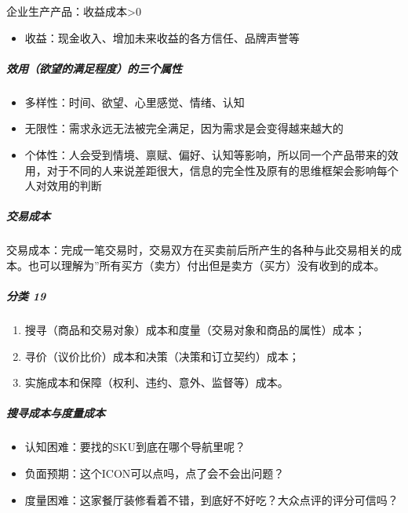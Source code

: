 \documentclass[letterpaper,10pt,english]{sphinxmanual}
\begin{document}
企业生产产品：收益\sphinxhyphen{}成本>0
\begin{itemize}
\item {} 
收益：现金收入、增加未来收益的各方信任、品牌声誉等

\end{itemize}


\subparagraph{效用（欲望的满足程度）的三个属性}
\label{\detokenize{chapter_idea/business:id18}}\begin{itemize}
\item {} 
多样性：时间、欲望、心里感觉、情绪、认知

\item {} 
无限性：需求永远无法被完全满足，因为需求是会变得越来越大的

\item {} 
个体性：人会受到情境、禀赋、偏好、认知等影响，所以同一个产品带来的效用，对于不同的人来说差距很大，信息的完全性及原有的思维框架会影响每个人对效用的判断

\end{itemize}


\subparagraph{交易成本}
\label{\detokenize{chapter_idea/business:id19}}
交易成本：完成一笔交易时，交易双方在买卖前后所产生的各种与此交易相关的成本。也可以理解为”所有买方（卖方）付出但是卖方（买方）没有收到的成本。


\subparagraph{分类 19\sphinxfootnotemark[412]}
\label{\detokenize{chapter_idea/business:id20}}%
\begin{footnotetext}[412]\sphinxAtStartFootnote
{}
%
\end{footnotetext}\ignorespaces \begin{enumerate}
%
\item {} 
搜寻（商品和交易对象）成本和度量（交易对象和商品的属性）成本；

\item {} 
寻价（议价比价）成本和决策（决策和订立契约）成本；

\item {} 
实施成本和保障（权利、违约、意外、监督等）成本。

\end{enumerate}


\subparagraph{搜寻成本与度量成本}
\label{\detokenize{chapter_idea/business:id21}}\begin{itemize}
\item {} 
认知困难：要找的SKU到底在哪个导航里呢？

\item {} 
负面预期：这个ICON可以点吗，点了会不会出问题？

\item {} 
度量困难：这家餐厅装修看着不错，到底好不好吃？大众点评的评分可信吗？

\end{itemize}
\end{document}
